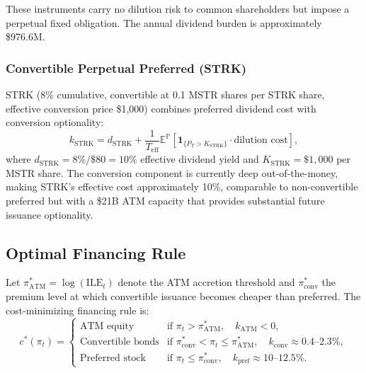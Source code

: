 \medskip
These instruments carry no dilution risk to common shareholders
but impose a perpetual fixed obligation.
The annual dividend burden is approximately \$976.6M.

\subsubsection{Convertible Perpetual Preferred (STRK)}

STRK (8\% cumulative, convertible at 0.1 MSTR shares per STRK share,
effective conversion price \$1{,}000) combines preferred dividend cost
with conversion optionality:
\begin{equation}
  k_{\mathrm{STRK}} = d_{\mathrm{STRK}} + \frac{1}{T_{\mathrm{eff}}}
  \mathbb{E}^{\mathbb{P}}\!\left[
    \mathbf{1}_{\{P_T > K_{\mathrm{STRK}}\}}
    \cdot \text{dilution cost}
  \right],
  \label{eq:strk_cost}
\end{equation}
where $d_{\mathrm{STRK}} = 8\%/\$80 = 10\%$ effective dividend yield
and $K_{\mathrm{STRK}} = \$1{,}000$ per MSTR share.
The conversion component is currently deep out-of-the-money,
making STRK's effective cost approximately 10\%, comparable to
non-convertible preferred but with a \$21B ATM capacity that
provides substantial future issuance optionality.

\subsection{Optimal Financing Rule}

\begin{proposition}
\label{prop:optimal_channel}
Let $\pi^*_{\mathrm{ATM}} = \log(\mathrm{ILE}_t)$ denote the ATM accretion
threshold and $\pi^*_{\mathrm{conv}}$ the premium level at which
convertible issuance becomes cheaper than preferred.
The cost-minimizing financing rule is:
\begin{equation}
  c^*(\pi_t) =
  \begin{cases}
    \text{ATM equity} & \text{if } \pi_t > \pi^*_{\mathrm{ATM}},
      \quad k_{\mathrm{ATM}} < 0, \\[4pt]
    \text{Convertible bonds} & \text{if } \pi^*_{\mathrm{conv}} < \pi_t
      \le \pi^*_{\mathrm{ATM}},
      \quad k_{\mathrm{conv}} \approx 0.4\text{--}2.3\%, \\[4pt]
    \text{Preferred stock} & \text{if } \pi_t \le \pi^*_{\mathrm{conv}},
      \quad k_{\mathrm{pref}} \approx 10\text{--}12.5\%.
  \end{cases}
  \label{eq:optimal_channel}
\end{equation}
\end{proposition}

